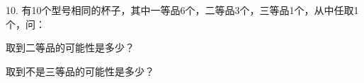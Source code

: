 10.	有10个型号相同的杯子，其中一等品6个，二等品3个，三等品1个，从中任取1个，问：

\begin{subquestions}

    \subquestion 取到二等品的可能性是多少？

    \subquestion 取到不是三等品的可能性是多少？

\end{subquestions}





